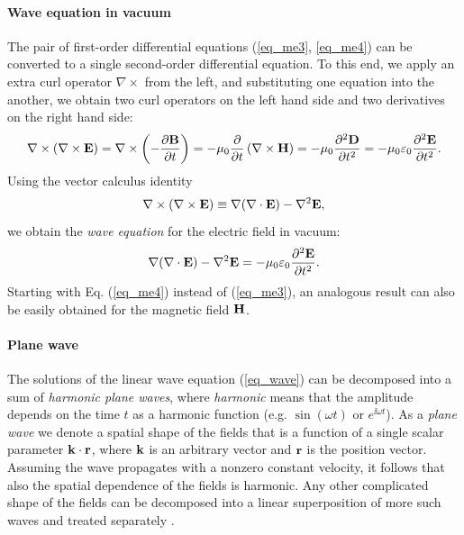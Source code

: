 \paragraph{Wave equation in vacuum} %
The pair of first-order differential equations (\ref{eq_me3}, \ref{eq_me4}) can be converted to a single second-order differential equation. To this end, we apply an extra curl operator $\nabla\times$ from the left, and substituting one equation into the another, we obtain two curl operators on the left hand side and two derivatives on the right hand side: 
\label{starttext}
\begin{equation} \nabla\times (\nabla\times \mathbf{E}) = \nabla\times \left(- \frac{\partial \mathbf{B}} {\partial t}\right) = -\mu_0 \frac{\partial}{\partial t} \left(\nabla\times \mathbf{H}\right) 
= -\mu_0 \frac{\partial^{2} \mathbf{D}}{\partial t^{2}} = -\mu_0 \varepsilon_0 \frac{\partial^{2} \mathbf{E}}{\partial t^{2}}.  \label{eq_elim}\end{equation}
Using the vector calculus identity
\begin{equation} \nabla\times (\nabla\times \mathbf{E}) \equiv \nabla (\nabla \cdot \mathbf{E}) - \nabla^2 \mathbf{E}, \label{eq_rotrot}\end{equation}
we obtain the \textit{wave equation} for the electric field in vacuum: 
\begin{equation}  \nabla (\nabla \cdot \mathbf{E}) - \nabla^2 \mathbf{E} = -\mu_0 \varepsilon_0 \frac{\partial^{2} \mathbf{E}}{\partial t^{2}}.  \label{eq_wave}\end{equation}
Starting with Eq. (\ref{eq_me4}) instead of (\ref{eq_me3}), an analogous result can also be easily obtained for the magnetic field $\mathbf{H}$.

\paragraph{Plane wave} %
The solutions of the linear wave equation (\ref{eq_wave}) can be decomposed into a sum of \textit{harmonic plane waves}, where \textit{harmonic} means that the amplitude depends on the time $t$ as a harmonic function (e.g. $\sin(\omega t)$ or $e^{\ii \omega t}$). As a \textit{plane wave} we denote a spatial shape of the fields that is a function of a single scalar parameter ${\mathbf{k}}\cdot{\mathbf{r}}$, where ${\mathbf{k}}$ is an arbitrary vector and ${\mathbf{r}}$ is the position vector. Assuming the wave propagates with a nonzero constant velocity, it follows that also the spatial dependence of the fields is harmonic. Any other complicated shape of the fields can be decomposed into a linear superposition of more such waves and treated separately \cite{jackson1962book}. 

